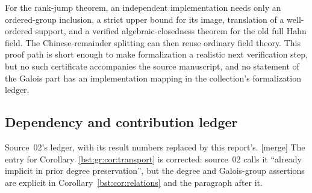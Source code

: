 \documentclass[11pt,letterpaper]{article}
\theoremstyle{definition}
\theoremstyle{remark}
\begin{document}
For the rank-jump theorem, an independent implementation needs only an
ordered-group inclusion, a strict upper bound for its image, translation of a
well-ordered support, and a verified algebraic-closedness theorem for the old
full Hahn field. The Chinese-remainder splitting can then reuse ordinary
field theory. This proof path is short enough to make formalization a
realistic next verification step, but no such certificate accompanies the
source manuscript, and no statement of the Galois part has an
implementation mapping in the collection's formalization ledger.

\subsection{Dependency and contribution ledger}\label{bst:gr:subsec:ledger}

Source~02's ledger, with its result numbers replaced by this report's.
\textup{[merge]} The entry for Corollary~\ref{bst:gr:cor:transport} is
corrected: source~02 calls it ``already implicit in prior degree
preservation'', but the degree and Galois-group assertions are explicit in
Corollary~\ref{bst:cor:relations} and the paragraph after it.
\end{document}
